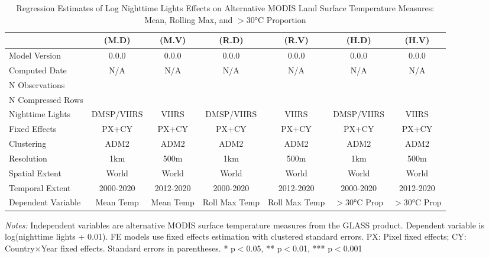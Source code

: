 \begin{table}[htbp]
\centering
\footnotesize
\caption{Regression Estimates of Log Nighttime Lights Effects on Alternative MODIS Land Surface Temperature Measures: Mean, Rolling Max, and $>$30°C Proportion}
\begin{tabular}{lcccccc}
\toprule
 & (M.D) & (M.V) & (R.D) & (R.V) & (H.D) & (H.V) \\
\midrule
\midrule
Model Version & 0.0.0 & 0.0.0 & 0.0.0 & 0.0.0 & 0.0.0 & 0.0.0 \\
Computed Date & N/A & N/A & N/A & N/A & N/A & N/A \\
N Observations &  &  &  &  &  &  \\
N Compressed Rows &  &  &  &  &  &  \\
\midrule
Nighttime Lights & DMSP/VIIRS & VIIRS & DMSP/VIIRS & VIIRS & DMSP/VIIRS & VIIRS \\
Fixed Effects & PX+CY & PX+CY & PX+CY & PX+CY & PX+CY & PX+CY \\
Clustering & ADM2 & ADM2 & ADM2 & ADM2 & ADM2 & ADM2 \\
Resolution & 1km & 500m & 1km & 500m & 1km & 500m \\
Spatial Extent & World & World & World & World & World & World \\
Temporal Extent & 2000-2020 & 2012-2020 & 2000-2020 & 2012-2020 & 2000-2020 & 2012-2020 \\
Dependent Variable & Mean Temp & Mean Temp & Roll Max Temp & Roll Max Temp & $>$30°C Prop & $>$30°C Prop \\
\bottomrule
\end{tabular}
\begin{threeparttable}
\begin{tablenotes}\small
\item \textit{Notes:} Independent variables are alternative MODIS surface temperature measures from the GLASS product. Dependent variable is log(nighttime lights + 0.01). FE models use  fixed effects estimation with clustered standard errors. PX: Pixel fixed effects; CY: Country×Year fixed effects. Standard errors in parentheses. * p$<$0.05, ** p$<$0.01, *** p$<$0.001
\end{tablenotes}
\end{threeparttable}
\end{table}